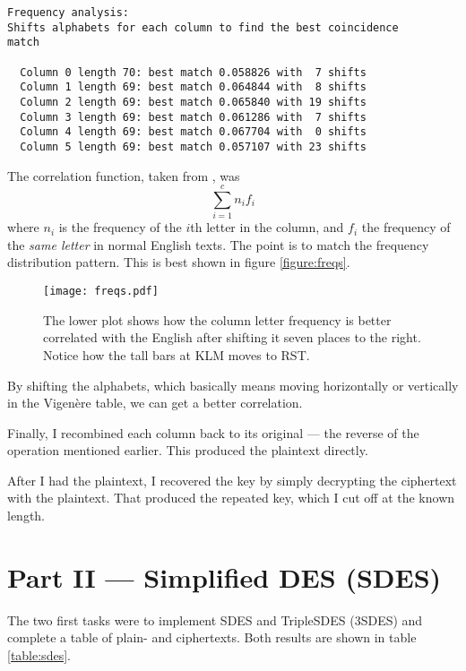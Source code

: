 \documentclass[a4paper,english,12pt]{article}
\begin{document}
\begin{verbatim}
Frequency analysis:
Shifts alphabets for each column to find the best coincidence
match

  Column 0 length 70: best match 0.058826 with  7 shifts
  Column 1 length 69: best match 0.064844 with  8 shifts
  Column 2 length 69: best match 0.065840 with 19 shifts
  Column 3 length 69: best match 0.061286 with  7 shifts
  Column 4 length 69: best match 0.067704 with  0 shifts
  Column 5 length 69: best match 0.057107 with 23 shifts
\end{verbatim}

The correlation function, taken from \cite{wiki:coincidence}, was
\[
  \sum_{i=1}^{c} n_i f_i
\]
where $n_i$ is the frequency of the $i$th letter in the column, and $f_i$ the
frequency of the \textit{same letter} in normal English texts. The point is to
match the frequency distribution pattern. This is best shown in figure
\vref{figure:freqs}.

\begin{figure}
  \centering
  \texttt{[image: freqs.pdf]}
  \caption{The lower plot shows how the column letter frequency is better
  correlated with the English after shifting it seven places to the right.
  Notice how the tall bars at KLM moves to RST.}
  \label{figure:freqs}
\end{figure}

By shifting the alphabets, which basically means moving horizontally or
vertically in the Vigenère table, we can get a better correlation.

Finally, I recombined each column back to its original --- the reverse of the
operation mentioned earlier. This produced the plaintext directly.

After I had the plaintext, I recovered the key by simply decrypting the
ciphertext with the plaintext. That produced the repeated key, which I cut off
at the known length.

\section{Part II --- Simplified DES (SDES)}

The two first tasks were to implement SDES and TripleSDES (3SDES) and complete
a table of plain- and ciphertexts. Both results are shown in table
\vref{table:sdes}.
\end{document}
